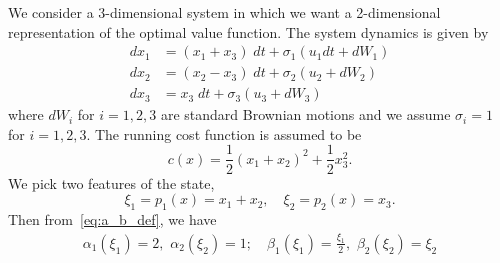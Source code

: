 \documentclass[letterpaper]{article} %
\begin{document}
We consider a 3-dimensional system in which we want a 2-dimensional representation of the optimal value function. The system dynamics is given by
\begin{equation}
\label{eq:3d_system_experiment}
\begin{aligned}
    dx_1 &= (x_1 + x_3) \; dt + \sigma_1 (u_1 dt + dW_1) \\
    dx_2 &= (x_2 - x_3) \; dt + \sigma_2 (u_2 + dW_2) \\
    dx_3 &= x_3 \; dt + \sigma_3 (u_3 + dW_3)
\end{aligned}
\end{equation}
where $dW_i$ for $i = 1,2,3$ are standard Brownian motions and we assume $\sigma_i = 1$ for $i = 1,2,3$.
The running cost function is assumed to be
\begin{equation}
\label{eq:3d_system_experiment_cost}
    c(x) = \frac{1}{2}(x_1+x_2)^2 + \frac{1}{2}x_3^2.
\end{equation}
We pick two features of the state,
\begin{equation}
\label{eq:3d_features}
    \xi_1 = p_1(x) = x_1+x_2, \quad \xi_2 = p_2(x) = x_3.
\end{equation}
Then from~\eqref{eq:a_b_def}, we have
\begin{equation}
\label{eq:3d_alpha_beta}
\begin{aligned}
    \alpha_1(\xi_1) = 2, \,\, \alpha_2(\xi_2) = 1; \quad \beta_1(\xi_1) = \frac{\xi_1}{2}, \,\, \beta_2(\xi_2) = \xi_2
\end{aligned}
\end{equation}
\end{document}
